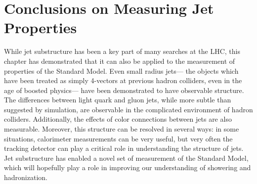 


\section{Conclusions on Measuring Jet Properties}

While jet substructure has been a key part of many searches at the LHC, this chapter has demonstrated that it can also be applied to the measurement of properties of the Standard Model. Even small radius jets--- the objects which have been treated as simply 4-vectors at previous hadron colliders, even in the age of boosted physics--- have been demonstrated to have observable structure. The differences between light quark and gluon jets, while more subtle than suggested by simulation, are observable in the complicated environment of hadron colliders. Additionally, the effects of color connections between jets are also measurable. Moreover, this structure can be resolved in several ways: in some situations, calorimeter measurements can be very useful, but very often the tracking detector can play a critical role in understanding the structure of jets. Jet substructure has enabled a novel set of measurement of the Standard Model, which will hopefully play a role in improving our understanding of showering and hadronization.
